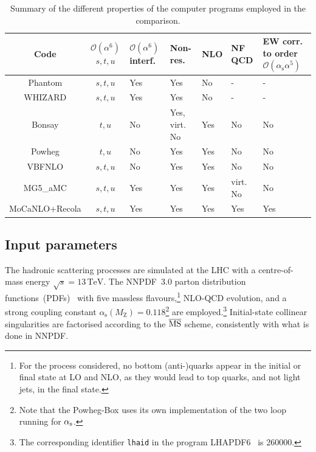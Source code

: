 \documentclass[twocolumn,epjc3]{svjour3} %
\newcommand{\PZ}{\ensuremath{\text{Z}}\xspace}
\newcommand{\MZ}{\ensuremath{M_\PZ}\xspace}
\newcommand{\TeV}{\ensuremath{\,\text{TeV}}\xspace}
\newcommand{\alphas}{\ensuremath{\alpha_\text{s}}\xspace}
\newlength{\width}
\begin{document}
    \begin{table}
        \footnotesize
        \begin{tabularx}{\textwidth}{c|c|X|X|X|X|X}
            Code  &  $\mathcal O(\alpha^6)$ $s, t, u$  &  $\mathcal O(\alpha^6)$ interf.  &  Non-res.  & NLO &  NF QCD  &  EW corr. to order $\mathcal O(\alphas \alpha^5)$  \\
            \hline
            \hline
            {\sc Phantom}       &  $s,t,u$  &  Yes      &  Yes              &  No    & -        & - \\
            {\sc WHIZARD}       &  $s,t,u$  &  Yes      &  Yes              &  No    & -        & - \\
            {\sc Bonsay}        &  $t,u$    &  No       &  Yes, virt. No    &  Yes   & No       &  No  \\
            {\sc Powheg}        &  $t,u$    &  No       &  Yes              &  Yes   & No       &  No  \\
            {\sc VBFNLO}        &  $s,t,u$  &  No       &  Yes              &  Yes   & No       &  No  \\
            {\sc MG5\_aMC}      &  $s,t,u$  &  Yes      &  Yes              &  Yes   & virt. No &  No \\
            {\sc MoCaNLO+Recola}&  $s,t,u$  &  Yes      &  Yes              &  Yes   & Yes      &  Yes  \\
        \end{tabularx}
        \caption{\label{tab:wg1_codes} Summary of the different properties of the computer programs employed in the comparison.}
    \end{table}
    \subsection{Input parameters}
        \label{subsec:inputpar}
    The hadronic scattering processes are simulated at the LHC with a centre-of-mass energy $\sqrt s = 13 \TeV$.
    The NNPDF~3.0 parton distribution functions~(PDFs)~\cite{Ball:2014uwa} with five massless flavours,\footnote{For the process considered, no bottom (anti-)quarks appear in the initial or final state at LO and NLO, as they would lead to top quarks, and not light jets, in the final state.} 
    NLO-QCD evolution, and a strong coupling constant $\alphas\left( \MZ \right) = 0.118$\footnote{Note that the {\sc Powheg-Box} uses its own implementation of the two loop running for $\alpha_{\rm s}$.} are employed.\footnote{The corresponding identifier {\tt lhaid} in the program LHAPDF6~\cite{Buckley:2014ana} is 260000.}
    Initial-state collinear singularities are factorised according to the ${\overline{\rm MS}}$ scheme, consistently with what is done in NNPDF.
\end{document}

